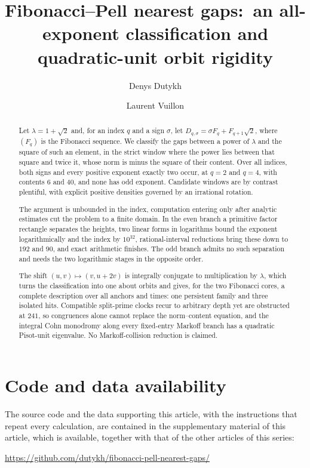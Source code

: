 \documentclass[11pt,reqno]{amsart}
\title[Fibonacci--Pell nearest gaps]{Fibonacci--Pell nearest gaps:\ an all-exponent classification and quadratic-unit orbit rigidity}
\author{Denys Dutykh}
\author{Laurent Vuillon}
\theoremstyle{definition}
\begin{document}
\begin{abstract}
Let $\lambda=1+\sqrt2$ and, for an index $q$ and a sign $\sigma$, let
$D_{q,\sigma}=\sigma F_q+F_{q+1}\sqrt2$, where $(F_q)$ is the Fibonacci
sequence. We classify the gaps between a power of $\lambda$ and the
square of such an element, in the strict window where the power lies
between that square and twice it, whose norm is minus the square of
their content. Over all indices, both signs and every positive exponent
exactly two occur, at $q=2$ and $q=4$, with contents $6$ and $40$, and
none has odd exponent. Candidate windows are by contrast plentiful, with
explicit positive densities governed by an irrational rotation.

The argument is unbounded in the index, computation entering only after
analytic estimates cut the problem to a finite domain. In the even
branch a primitive factor rectangle separates the heights, two linear
forms in logarithms bound the exponent logarithmically and the index by
$10^{32}$, rational-interval reductions bring these down to $192$ and
$90$, and exact arithmetic finishes. The odd branch admits no such
separation and needs the two logarithmic stages in the opposite order.

The shift $(u,v)\mapsto(v,u+2v)$ is integrally conjugate to
multiplication by $\lambda$, which turns the classification into one
about orbits and gives, for the two Fibonacci cores, a complete
description over all anchors and times: one persistent family and three
isolated hits. Compatible split-prime clocks recur to arbitrary depth
yet are obstructed at $241$, so congruences alone cannot replace the
norm--content equation, and the integral Cohn monodromy along every
fixed-entry Markoff branch has a quadratic Pisot-unit eigenvalue. No
Markoff-collision reduction is claimed.
\end{abstract}

\maketitle












\raggedbottom
\section*{Code and data availability}
The source code and the data supporting this article, with the instructions
that repeat every calculation, are contained in the supplementary material of
this article, which is available, together with that of the other articles of
this series:

{\centering
\url{https://github.com/dutykh/fibonacci-pell-nearest-gaps/}
\par}



\end{document}
